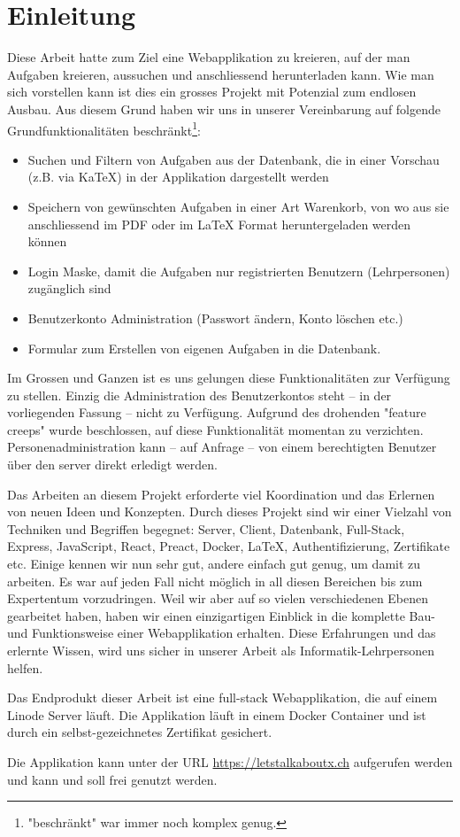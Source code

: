 
\section{Einleitung}

Diese Arbeit hatte zum Ziel eine Webapplikation zu kreieren, auf der man Aufgaben kreieren, aussuchen und anschliessend herunterladen kann. Wie man sich vorstellen kann ist dies ein grosses Projekt mit Potenzial zum endlosen Ausbau. Aus diesem Grund haben wir uns in unserer Vereinbarung auf folgende Grundfunktionalitäten beschränkt\footnote{"beschränkt" war immer noch komplex genug.}:
\begin{itemize}
  \item Suchen und Filtern von Aufgaben aus der Datenbank, die in einer Vorschau (z.B. via KaTeX) in der Applikation dargestellt werden
  \item Speichern von gewünschten Aufgaben in einer Art Warenkorb, von wo aus sie anschliessend im PDF oder im LaTeX Format heruntergeladen werden können
  \item Login Maske, damit die Aufgaben nur registrierten Benutzern (Lehrpersonen) zugänglich sind
  \item Benutzerkonto Administration (Passwort ändern, Konto löschen etc.)
  \item Formular zum Erstellen von eigenen Aufgaben in die Datenbank.
\end{itemize}

Im Grossen und Ganzen ist es uns gelungen diese Funktionalitäten zur Verfügung zu stellen. Einzig die Administration des Benutzerkontos steht -- in der vorliegenden Fassung -- nicht zu Verfügung. Aufgrund des drohenden "feature creeps" wurde beschlossen, auf diese Funktionalität momentan zu verzichten. Personenadministration kann -- auf Anfrage -- von einem berechtigten Benutzer über den server direkt erledigt werden.

Das Arbeiten an diesem Projekt erforderte viel Koordination und das Erlernen von neuen Ideen und Konzepten.  Durch dieses Projekt sind wir einer Vielzahl von Techniken und Begriffen begegnet: Server, Client, Datenbank, Full-Stack, Express, JavaScript, React, Preact, Docker, \LaTeX, Authentifizierung, Zertifikate etc. Einige kennen wir nun sehr gut, andere einfach gut genug, um damit zu arbeiten. Es war auf jeden Fall nicht möglich in all diesen Bereichen bis zum Expertentum vorzudringen. Weil wir aber auf so vielen verschiedenen Ebenen gearbeitet haben, haben wir einen einzigartigen Einblick in die komplette Bau- und Funktionsweise einer Webapplikation erhalten. Diese Erfahrungen und das erlernte Wissen, wird uns sicher in unserer Arbeit als Informatik-Lehrpersonen helfen.

Das Endprodukt dieser Arbeit ist eine full-stack Webapplikation, die auf einem Linode Server läuft. Die Applikation läuft in einem Docker Container und ist durch ein selbst-gezeichnetes Zertifikat gesichert.

Die Applikation kann unter der URL \url{https://letstalkaboutx.ch} aufgerufen werden und kann und soll frei genutzt werden.